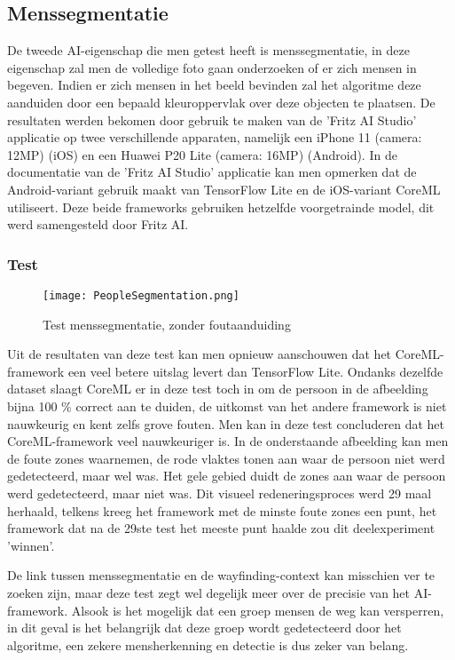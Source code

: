 \subsection{Menssegmentatie}
De tweede AI-eigenschap die men getest heeft is menssegmentatie, in deze eigenschap zal men de volledige foto gaan onderzoeken of er zich mensen in begeven. Indien er zich mensen in het beeld bevinden zal het algoritme deze aanduiden door een bepaald kleuroppervlak over deze objecten te plaatsen. De resultaten werden bekomen door gebruik te maken van de 'Fritz AI Studio' applicatie op twee verschillende apparaten, namelijk een iPhone 11 (camera: 12MP) (iOS) en een Huawei P20 Lite (camera: 16MP) (Android). In de documentatie van de 'Fritz AI Studio' applicatie kan men opmerken dat de Android-variant gebruik maakt van TensorFlow Lite en de iOS-variant CoreML utiliseert. Deze beide frameworks gebruiken hetzelfde voorgetrainde model, dit werd samengesteld door Fritz AI.

\newpage
\subsubsection{Test}

\begin{figure}[H]
	\centering
	\texttt{[image: PeopleSegmentation.png]}
	\caption{Test menssegmentatie, zonder foutaanduiding}
\end{figure}
Uit de resultaten van deze test kan men opnieuw aanschouwen dat het CoreML-framework een veel betere uitslag levert dan TensorFlow Lite. Ondanks dezelfde dataset slaagt CoreML er in deze test toch in om de persoon in de afbeelding bijna 100 \% correct aan te duiden, de uitkomst van het andere framework is niet nauwkeurig en kent zelfs grove fouten. Men kan in deze test concluderen dat het CoreML-framework veel nauwkeuriger is. In de onderstaande afbeelding kan men de foute zones waarnemen, de rode vlaktes tonen aan waar de persoon niet werd gedetecteerd, maar wel was. Het gele gebied duidt de zones aan waar de persoon werd gedetecteerd, maar niet was. Dit visueel redeneringsproces werd 29 maal herhaald, telkens kreeg het framework met de minste foute zones een punt, het framework dat na de 29ste test het meeste punt haalde zou dit deelexperiment 'winnen'.

 De link tussen menssegmentatie en de wayfinding-context kan misschien ver te zoeken zijn, maar deze test zegt wel degelijk meer over de precisie van het AI-framework. Alsook is het mogelijk dat een groep mensen de weg kan versperren, in dit geval is het belangrijk dat deze groep wordt gedetecteerd door het algoritme, een zekere mensherkenning en detectie is dus zeker van belang.

